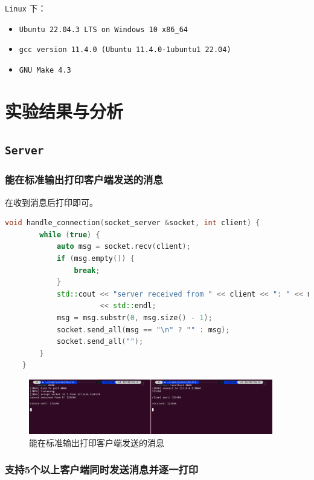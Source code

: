 \documentclass{article}
\begin{document}
\texttt{Linux} 下：

\begin{itemize}[noitemsep]
    \item \texttt{Ubuntu 22.04.3 LTS on Windows 10 x86\_64}
    \item \texttt{gcc version 11.4.0 (Ubuntu 11.4.0-1ubuntu1~22.04)}
    \item \texttt{GNU Make 4.3}
\end{itemize}


\section{实验结果与分析}

\subsection{\texttt{Server}}

\subsubsection{能在标准输出打印客户端发送的消息}

在收到消息后打印即可。

\begin{lstlisting}[language=C++]
    void handle_connection(socket_server &socket, int client) {
        while (true) {
            auto msg = socket.recv(client);
            if (msg.empty()) {
                break;
            }
            std::cout << "server received from " << client << ": " << msg
                      << std::endl;
            msg = msg.substr(0, msg.size() - 1);
            socket.send_all(msg == "\n" ? "" : msg);
            socket.send_all("");
        }
    }
\end{lstlisting}

\begin{figure}[H]
    \centering
    \includegraphics[width=0.95\textwidth]{img/1.png}
    \caption{能在标准输出打印客户端发送的消息}
\end{figure}

\subsubsection{支持5个以上客户端同时发送消息并逐一打印}
\end{document}
